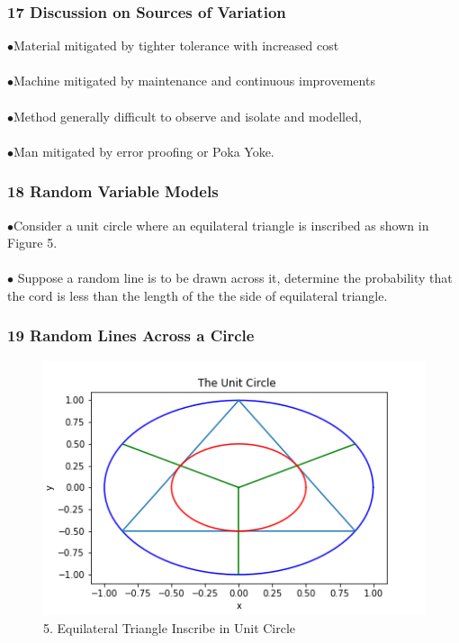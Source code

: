 \documentclass[11pt]{beamer}
\begin{document}
\begin{frame}
\frametitle{17 Discussion on Sources of Variation}
\noindent $\bullet$Material mitigated by tighter tolerance with increased cost \\ \ \\     $\bullet$Machine mitigated by maintenance and continuous improvements \\ \ \\     $\bullet$Method generally difficult to observe and isolate and modelled,  \\ \ \\     $\bullet$Man mitigated by error proofing or Poka Yoke.

\end{frame}

\begin{frame}
\frametitle{18 Random Variable Models}
\noindent $\bullet$Consider a unit circle where an equilateral triangle is inscribed as     shown in Figure 5. \\ \ \\     $\bullet$ Suppose a random line is to be drawn across it,     determine the probability that the cord is less than the length of the     the side of equilateral triangle. \\ 

\end{frame}

\begin{frame}
\frametitle{19 Random Lines Across a Circle}
\begin{figure}[H]
\centering\includegraphics[width=1\linewidth,height=0.7\textheight]{Fig05}
\caption{5. Equilateral Triangle Inscribe in     Unit Circle}
\label{fig:Fig05}
\end{figure}


\end{frame}
\end{document}
